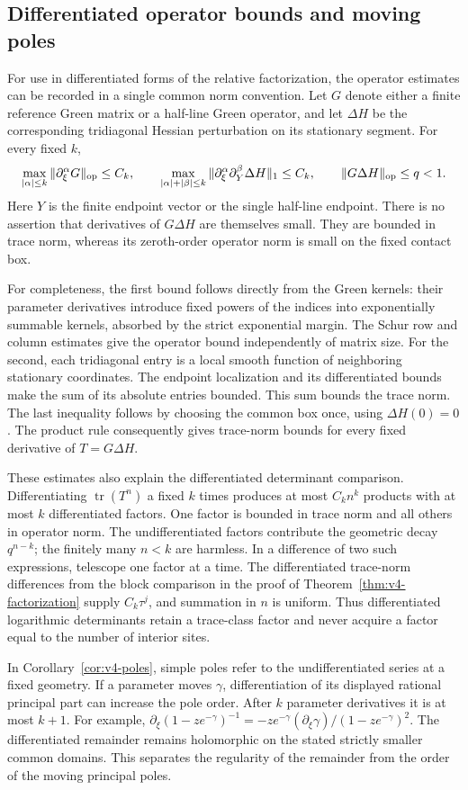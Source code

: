 \subsection{Differentiated operator bounds and moving poles}
For use in differentiated forms of the relative factorization, the
operator estimates can be recorded in a single common norm convention.
Let $G$ denote either a finite reference Green matrix or a half-line
Green operator, and let $\Delta H$ be the corresponding tridiagonal
Hessian perturbation on its stationary segment. For every fixed $k$,
\begin{equation}\label{eq:v5-operator-bounds}
 \max_{|\alpha|\le k}\|\partial_\xi^\alpha G\|_{\rm op}\le C_k,
 \qquad
 \max_{|\alpha|+|\beta|\le k}
       \|\partial_\xi^\alpha\partial_Y^\beta\Delta H\|_1\le C_k,
 \qquad \|G\Delta H\|_{\rm op}\le q<1.
\end{equation}
Here $Y$ is the finite endpoint vector or the single half-line endpoint.
There is no assertion that derivatives of $G\Delta H$ are themselves
small. They are bounded in trace norm, whereas its zeroth-order operator
norm is small on the fixed contact box.

For completeness, the first bound follows directly from the Green
kernels: their parameter derivatives introduce fixed powers of the
indices into exponentially summable kernels, absorbed by the strict
exponential margin. The Schur row and column estimates give the operator
bound independently of matrix size. For the second, each tridiagonal
entry is a local smooth function of neighboring stationary coordinates.
The endpoint localization and its differentiated bounds make the sum
of its absolute entries bounded. This sum bounds the trace norm.
The last inequality follows by choosing the common box once, using
$\Delta H(0)=0$. The product rule consequently gives trace-norm bounds
for every fixed derivative of $T=G\Delta H$.

These estimates also explain the differentiated determinant comparison.
Differentiating $\operatorname{tr}(T^n)$ a fixed $k$ times produces at
most $C_kn^k$ products with at most $k$ differentiated factors. One
factor is bounded in trace norm and all others in operator norm. The
undifferentiated factors contribute the geometric decay $q^{n-k}$;
the finitely many $n<k$ are harmless. In a difference of two such
expressions, telescope one factor at a time. The differentiated
trace-norm differences from the block comparison in the proof of
Theorem~\ref{thm:v4-factorization} supply $C_k\tau^j$, and summation
in $n$ is uniform. Thus differentiated logarithmic determinants retain
a trace-class factor and never acquire a factor equal to the number
of interior sites.

In Corollary~\ref{cor:v4-poles}, simple poles refer to the undifferentiated
series at a fixed geometry. If a parameter moves $\gamma$, differentiation
of its displayed rational principal part can increase the pole order.
After $k$ parameter derivatives it is at most $k+1$. For example,
$\partial_\xi(1-ze^{-\gamma})^{-1}
=-ze^{-\gamma}(\partial_\xi\gamma)/(1-ze^{-\gamma})^2$.
The differentiated remainder remains holomorphic on the stated strictly
smaller common domains. This separates the regularity of the remainder
from the order of the moving principal poles.
